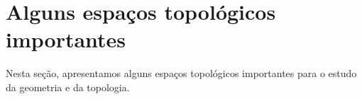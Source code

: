 \section{Alguns espaços topológicos importantes}
\label{alguns-espacos-topologicos-importantes}
Nesta seção, apresentamos alguns espaços topológicos importantes para o estudo da geometria e da topologia.



